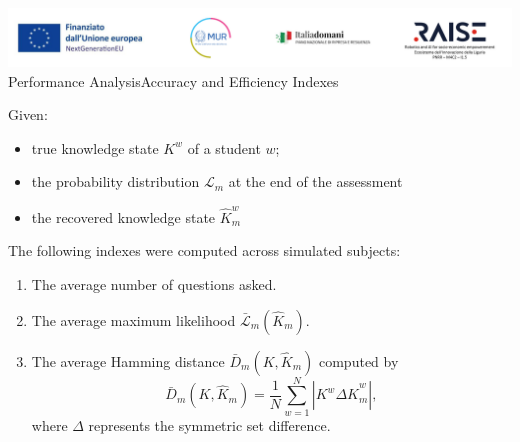 \documentclass{beamer}
\begin{document}
\begin{frame}{\includegraphics[scale=0.4]{Da_cambiare.png} \\ 
Performance Analysis}{Accuracy and Efficiency Indexes}
\footnotesize
    \begin{block}{Given:}
    \begin{itemize}
        \item true knowledge state $K^w$ of a student $w$;
        \item the probability distribution $\mathcal{L}_{m}$ at the end of the assessment
        \item the recovered knowledge state $\hat{K}_m^w$ 
    \end{itemize}
    \end{block}
    \vspace{.2cm}
The following indexes were computed across simulated subjects: 
    \vspace{.2cm}
\begin{enumerate}
\item The {\color{blue}average number of questions asked}.
\item The {\color{blue}average maximum likelihood} $\bar{\mathcal{L}}_m ( \hat{K}_m )$.
	\item The {\color{blue}average Hamming distance} $\bar{D}_m(K,\hat{K}_m)$
	computed by
\[
\bar{D}_m(K,\hat{K}_m)=\frac{1}{N}\sum_{w=1}^N |K^w \Delta \hat{K}_m^w|,
\]
where $\Delta$ represents the symmetric set difference.

\end{enumerate}
\end{frame}
\end{document}
